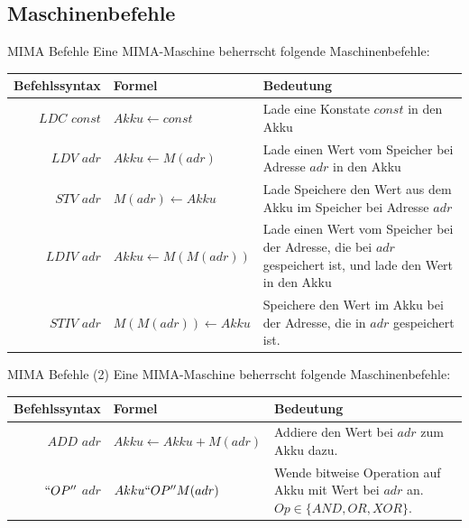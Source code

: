 \subsection{Maschinenbefehle}

\begin{frame}{MIMA Befehle}
	Eine MIMA-Maschine beherrscht folgende Maschinenbefehle:
	
	\vspace{.5cm}
	
	\begin{tabular}{r | l p{5cm} }
		Befehlssyntax & Formel & Bedeutung\\\hline\hline \ip
		$LDC$ $const$ & $Akku \leftarrow const$ & Lade eine Konstate $const$ in den Akku \\\hline \ip
		$LDV$ $adr$ & $Akku \leftarrow M(adr)$ & Lade einen Wert vom Speicher bei Adresse $adr$ in den Akku\\\hline\ip
		$STV$ $adr$ & $M(adr) \leftarrow Akku$ & Lade Speichere den Wert aus dem Akku im Speicher bei Adresse $adr$\\\hline\ip
		$LDIV$ $adr$ & $Akku \leftarrow M(M(adr))$ & Lade einen Wert vom Speicher bei der Adresse, die bei $adr$ gespeichert ist, und lade den Wert in den Akku\\\hline\ip
		$STIV$ $adr$ & $M(M(adr)) \leftarrow Akku$ & Speichere den Wert im Akku bei der Adresse, die in $adr$ gespeichert ist.
	\end{tabular}
\end{frame}

\begin{frame}{MIMA Befehle (2)}
	Eine MIMA-Maschine beherrscht folgende Maschinenbefehle:
	
	\vspace{.5cm}
	
	\begin{tabular}{r | l p{3cm} }
		Befehlssyntax & Formel & Bedeutung\\\hline\hline \ip
		$ADD$ $adr$ & $Akku \leftarrow Akku + M(adr)$ & Addiere den Wert bei $adr$ zum Akku dazu.\\\hline\ip
		$``OP''$ $adr$ & $Akku ``OP'' M(adr)$ & Wende bitweise Operation auf Akku mit Wert bei $adr$ an. $Op \in \{AND, OR, XOR\}$.
	\end{tabular}
\end{frame}

